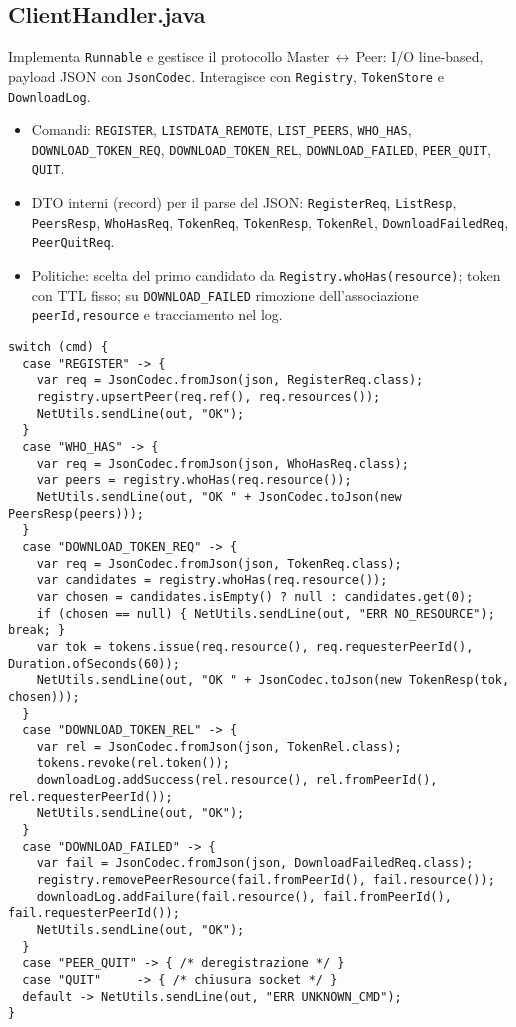 \documentclass[a4paper,12pt]{article}
\begin{document}
\subsection*{ClientHandler.java}
Implementa \texttt{Runnable} e gestisce il protocollo Master\,$\leftrightarrow$\,Peer: I/O line-based, payload JSON con \texttt{JsonCodec}. Interagisce con \texttt{Registry}, \texttt{TokenStore} e \texttt{DownloadLog}.
\begin{itemize}[nosep]
  \item Comandi: \texttt{REGISTER}, \texttt{LISTDATA\_REMOTE}, \texttt{LIST\_PEERS}, \texttt{WHO\_HAS}, \texttt{DOWNLOAD\_TOKEN\_REQ}, \texttt{DOWNLOAD\_TOKEN\_REL}, \texttt{DOWNLOAD\_FAILED}, \texttt{PEER\_QUIT}, \texttt{QUIT}.
  \item DTO interni (record) per il parse del JSON: \texttt{RegisterReq}, \texttt{ListResp}, \texttt{PeersResp}, \texttt{WhoHasReq}, \texttt{TokenReq}, \texttt{TokenResp}, \texttt{TokenRel}, \texttt{DownloadFailedReq}, \texttt{PeerQuitReq}.
  \item Politiche: scelta del primo candidato da \texttt{Registry.whoHas(resource)}; token con TTL fisso; su \texttt{DOWNLOAD\_FAILED} rimozione dell’associazione \texttt{peerId,resource} e tracciamento nel log.
\end{itemize}

\begin{lstlisting}
switch (cmd) {
  case "REGISTER" -> {
    var req = JsonCodec.fromJson(json, RegisterReq.class);
    registry.upsertPeer(req.ref(), req.resources());
    NetUtils.sendLine(out, "OK");
  }
  case "WHO_HAS" -> {
    var req = JsonCodec.fromJson(json, WhoHasReq.class);
    var peers = registry.whoHas(req.resource());
    NetUtils.sendLine(out, "OK " + JsonCodec.toJson(new PeersResp(peers)));
  }
  case "DOWNLOAD_TOKEN_REQ" -> {
    var req = JsonCodec.fromJson(json, TokenReq.class);
    var candidates = registry.whoHas(req.resource());
    var chosen = candidates.isEmpty() ? null : candidates.get(0);
    if (chosen == null) { NetUtils.sendLine(out, "ERR NO_RESOURCE"); break; }
    var tok = tokens.issue(req.resource(), req.requesterPeerId(), Duration.ofSeconds(60));
    NetUtils.sendLine(out, "OK " + JsonCodec.toJson(new TokenResp(tok, chosen)));
  }
  case "DOWNLOAD_TOKEN_REL" -> {
    var rel = JsonCodec.fromJson(json, TokenRel.class);
    tokens.revoke(rel.token());
    downloadLog.addSuccess(rel.resource(), rel.fromPeerId(), rel.requesterPeerId());
    NetUtils.sendLine(out, "OK");
  }
  case "DOWNLOAD_FAILED" -> {
    var fail = JsonCodec.fromJson(json, DownloadFailedReq.class);
    registry.removePeerResource(fail.fromPeerId(), fail.resource());
    downloadLog.addFailure(fail.resource(), fail.fromPeerId(), fail.requesterPeerId());
    NetUtils.sendLine(out, "OK");
  }
  case "PEER_QUIT" -> { /* deregistrazione */ }
  case "QUIT"     -> { /* chiusura socket */ }
  default -> NetUtils.sendLine(out, "ERR UNKNOWN_CMD");
}
\end{lstlisting}
\end{document}
